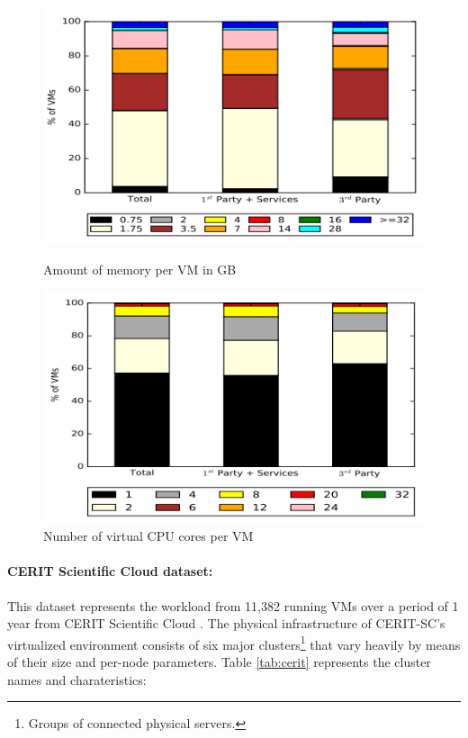 \documentclass[sigconf]{sigplanconf}
\begin{document}
  \begin{figure}[!h]
  	\centering
  	\begin{minipage}[t]{0.41\textwidth}
  		\centering
  		\includegraphics[scale=0.5]{azure_mem.png}
  		\caption{Amount of memory per VM in GB }
  		\label{azure)}
  	\end{minipage}
  	\hspace{2cm}
  	\begin{minipage}[t]{0.41\textwidth}
  		\centering
  		\includegraphics[scale=0.5]{azure_cores.png}
  		\caption{Number of virtual CPU cores per VM}
  		\label{fig:v4k}
  	\end{minipage}
  \end{figure}
  
  \newpage
  \paragraph{CERIT Scientific Cloud dataset:}
  This dataset represents the workload from 11,382 running VMs over a period of 1 year from CERIT Scientific Cloud \cite{cerit}. The physical infrastructure of CERIT-SC’s virtualized environment consists of six major clusters\footnote{ Groups of connected physical servers.} that vary heavily by means of their size and per-node parameters. Table \ref{tab:cerit} represents the cluster names and  charateristics:
  
\end{document}
